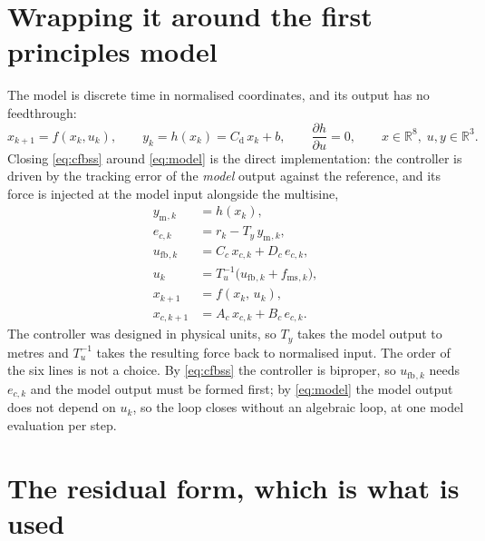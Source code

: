 \documentclass[11pt]{article}
\newcommand{\R}{\mathbb{R}}
\newcommand{\fms}{f_{\mathrm{ms}}}
\newcommand{\ufb}{u_{\mathrm{fb}}}
\newcommand{\ymodel}{y_{\mathrm{m}}}
\newcommand{\Tu}{T_{u}}
\newcommand{\Ty}{T_{y}}
\begin{document}
\section{Wrapping it around the first principles model}

The model is discrete time in normalised coordinates, and its output has no feedthrough:
\begin{equation}
  x_{k+1} = f(x_k, u_k) ,
  \qquad
  y_k = h(x_k) = C_{\mathrm{d}}\,x_k + b ,
  \qquad
  \frac{\partial h}{\partial u} = 0 ,
  \qquad
  x \in \R^{8},\; u,y \in \R^{3} .
  \label{eq:model}
\end{equation}
Closing \eqref{eq:cfbss} around \eqref{eq:model} is the direct implementation: the controller is
driven by the tracking error of the \emph{model} output against the reference, and its force is
injected at the model input alongside the multisine,
\begin{equation}
  \begin{aligned}
    \ymodel{}_{,k} &= h(x_k) , \\
    e_{c,k}        &= r_k - \Ty\,\ymodel{}_{,k} , \\
    \ufb{}_{,k}    &= C_c\,x_{c,k} + D_c\,e_{c,k} , \\
    u_k            &= \Tu^{-1}\bigl(\ufb{}_{,k} + \fms{}_{,k}\bigr) , \\
    x_{k+1}        &= f(x_k,\, u_k) , \\
    x_{c,k+1}      &= A_c\,x_{c,k} + B_c\,e_{c,k} .
  \end{aligned}
  \label{eq:direct}
\end{equation}
The controller was designed in physical units, so $\Ty$ takes the model output to metres and
$\Tu^{-1}$ takes the resulting force back to normalised input. The order of the six lines is not a
choice. By \eqref{eq:cfbss} the controller is biproper, so $\ufb{}_{,k}$ needs $e_{c,k}$ and the
model output must be formed first; by \eqref{eq:model} the model output does not depend on $u_k$,
so the loop closes without an algebraic loop, at one model evaluation per step.

\section{The residual form, which is what is used}
\end{document}
